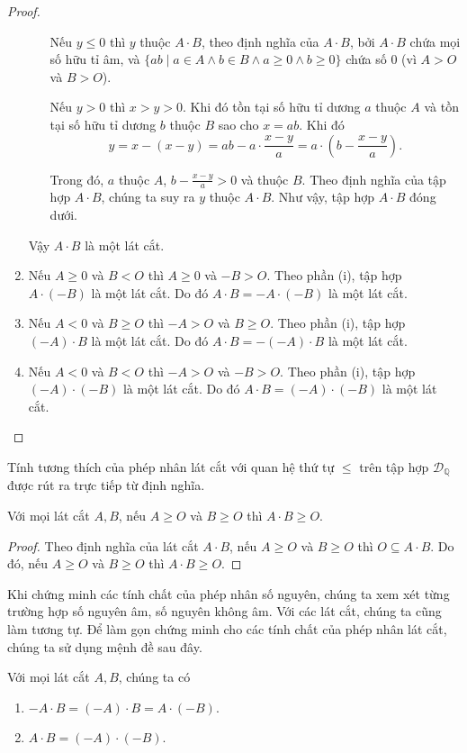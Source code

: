 \begin{proof}
\begin{enumerate}[label={(\roman*)}]
\begin{enumerate}[label={(DC\arabic*)}]
                        Nếu $y\leq 0$ thì $y$ thuộc $A\cdot B$, theo định nghĩa của $A\cdot B$, bởi $A\cdot B$ chứa mọi số hữu tỉ âm, và $\{ ab \mid a\in A\wedge b\in B\wedge a\geq 0\wedge b\geq 0 \}$ chứa số $0$ (vì $A > O$ và $B > O$).

                        Nếu $y > 0$ thì $x > y > 0$. Khi đó tồn tại số hữu tỉ dương $a$ thuộc $A$ và tồn tại số hữu tỉ dương $b$ thuộc $B$ sao cho $x = ab$. Khi đó
                        \[
                            y = x - (x - y) = ab - a\cdot\frac{x-y}{a} = a\cdot\left( b - \frac{x - y}{a} \right).
                        \]

                        Trong đó, $a$ thuộc $A$, $b - \frac{x - y}{a} > 0$ và thuộc $B$. Theo định nghĩa của tập hợp $A\cdot B$, chúng ta suy ra $y$ thuộc $A\cdot B$. Như vậy, tập hợp $A\cdot B$ đóng dưới.
              \end{enumerate}

              Vậy $A\cdot B$ là một lát cắt.
        \item Nếu $A\geq 0$ và $B < O$ thì $A\geq 0$ và $-B > O$. Theo phần (i), tập hợp $A\cdot (-B)$ là một lát cắt. Do đó $A\cdot B = -A\cdot (-B)$ là một lát cắt.
        \item Nếu $A < 0$ và $B\geq O$ thì $-A > O$ và $B\geq O$. Theo phần (i), tập hợp $(-A)\cdot B$ là một lát cắt. Do đó $A\cdot B = -(-A)\cdot B$ là một lát cắt.
        \item Nếu $A < 0$ và $B < O$ thì $-A > O$ và $-B > O$. Theo phần (i), tập hợp $(-A)\cdot (-B)$ là một lát cắt. Do đó $A\cdot B = (-A)\cdot (-B)$ là một lát cắt.
    \end{enumerate}
\end{proof}

Tính tương thích của phép nhân lát cắt với quan hệ thứ tự $\leq$ trên tập hợp $\mathscr{D}_{\mathbb{Q}}$ được rút ra trực tiếp từ định nghĩa.
\begin{theorem}
    Với mọi lát cắt $A, B$, nếu $A\geq O$ và $B\geq O$ thì $A\cdot B\geq O$.
\end{theorem}

\begin{proof}
    Theo định nghĩa của lát cắt $A\cdot B$, nếu $A\geq O$ và $B\geq O$ thì $O\subseteq A\cdot B$. Do đó, nếu $A\geq O$ và $B\geq O$ thì $A\cdot B\geq O$.
\end{proof}

Khi chứng minh các tính chất của phép nhân số nguyên, chúng ta xem xét từng trường hợp số nguyên âm, số nguyên không âm. Với các lát cắt, chúng ta cũng làm tương tự. Để làm gọn chứng minh cho các tính chất của phép nhân lát cắt, chúng ta sử dụng mệnh đề sau đây.
\begin{proposition}\label{proposition:dedekind-cuts-and-sign}
    Với mọi lát cắt $A, B$, chúng ta có
    \begin{enumerate}[label={(\roman*)}]
        \item $-A\cdot B = (-A)\cdot B = A\cdot (-B)$.
        \item $A\cdot B = (-A)\cdot (-B)$.
    \end{enumerate}
\end{proposition}

